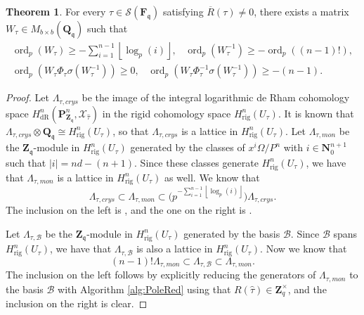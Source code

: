 \documentclass[a4paper,11pt]{article}
\numberwithin{equation}{section}
\providecommand{\abs}[1]{\lvert#1\rvert}                 %
\providecommand{\floor}[1]{\left\lfloor#1\right\rfloor}   %
\newcommand{\NN}{\mathbf{N}} %
\newcommand{\ZZ}{\mathbf{Z}} %
\newcommand{\QQ}{\mathbf{Q}} %
\newcommand{\FF}{\mathbf{F}} %
\DeclareMathOperator{\ord}{ord}          %
\providecommand{\HdR}{H_{\text{dR}}}    %
\providecommand{\Hrig}{H_{\text{rig}}}  %
\providecommand{\cB}{\mathcal{B}} %
\theoremstyle{definition}
\newtheorem{thm}{Theorem}[section]
\begin{document}
\begin{thm} \label{thm:deltabound}
For every 
$\tau \in \mathcal{S}(\FF_{\mathfrak{q}})$ satisfying $\overline{R}(\tau) \neq 0$, there exists a 
matrix $W_{\tau} \in M_{b \times b}(\QQ_{\mathfrak{q}})$ such that 
\begin{align*}
\ord_p(W_{\tau}) \geq -\sum_{i=1}^{n-1} \floor{\log_p(i)}, \; \; \; 
\ord_p(W_{\tau}^{-1}) \geq -\ord_p((n-1)!), \\
\ord_p(W_{\tau} \Phi_{\tau} \sigma(W_{\tau}^{-1})) \geq 0, \; \; \; 
\ord_p(W_{\tau} \Phi_{\tau}^{-1} \sigma(W_{\tau}^{-1})) \geq -(n-1).
\end{align*}
\end{thm}

\begin{proof}
Let $\Lambda_{\tau, crys}$ be the image of the integral logarithmic de Rham cohomology space
$\HdR^n(\mathbf{P}_{\mathbf{Z}_{\mathfrak{q}}}^n,\mathcal{X}_{\hat{\tau}})$ in the rigid cohomology
space $\Hrig^n(U_{\tau})$. It is known that
$\Lambda_{\tau, crys} \otimes \QQ_{\mathfrak{q}} \cong \Hrig^n(U_{\tau})$, so that
$\Lambda_{\tau, crys}$ is a lattice in $\Hrig^n(U_{\tau})$. Let $\Lambda_{\tau, mon}$
be the $\ZZ_{\mathfrak{q}}$-module in $\Hrig^n(U_{\tau})$ generated by the classes
of $x^i \Omega/P^n$ with $i \in \NN_0^{n+1}$ such that $\abs{i}=nd-(n+1)$. Since
these classes generate $\Hrig^n(U_{\tau})$, we have that $\Lambda_{\tau,mon}$ is a 
lattice in $\Hrig^n(U_{\tau})$ as well. We know that
\[
\Lambda_{\tau,crys} \subset \Lambda_{\tau,mon} \subset \bigl( p^{-\sum_{i=1}^{n-1} \floor{\log_p(i)}} \bigr) \Lambda_{\tau,crys}.
\]
The inclusion on the left is \cite[Lemma 3.4.3]{AbbottKedlayaRoe2006}, and the one on the right 
is \cite[Proposition 3.4.6]{AbbottKedlayaRoe2006}.

Let $\Lambda_{\tau,\cB}$ be the $\ZZ_{\mathfrak{q}}$-module in $\Hrig^n(U_{\tau})$ generated 
by the basis $\cB$. Since $\cB$ spans $\Hrig^n(U_{\tau})$, we have that $\Lambda_{\tau,\cB}$ is also a 
lattice in $\Hrig^n(U_{\tau})$. Now we know that
\[
(n-1)! \Lambda_{\tau,mon} \subset \Lambda_{\tau,\cB} \subset \Lambda_{\tau,mon}. 
\]
The inclusion on the left follows by explicitly reducing the generators of $\Lambda_{\tau,mon}$ 
to the basis $\cB$ with Algorithm \ref{alg:PoleRed} using that $R(\hat{\tau}) \in \ZZ_q^{\times}$, and
the inclusion on the right is clear.


\end{proof}
\end{document}
